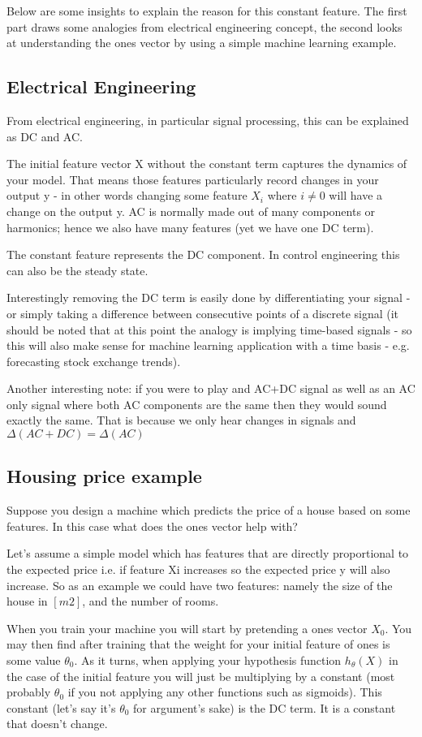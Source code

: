 Below are some insights to explain the reason for this constant feature. The first part draws some analogies from electrical engineering concept, the second looks at understanding the ones vector by using a simple machine learning example.

\subsection{Electrical Engineering}
From electrical engineering, in particular signal processing, this can be explained as DC and AC.

The initial feature vector X without the constant term captures the dynamics of your model. That means those features particularly record changes in your output y - in other words changing some feature $X_i$ where $i\neq0$ will have a change on the output y. AC is normally made out of many components or harmonics; hence we also have many features (yet we have one DC term).

The constant feature represents the DC component. In control engineering this can also be the steady state.

Interestingly removing the DC term is easily done by differentiating your signal - or simply taking a difference between consecutive points of a discrete signal (it should be noted that at this point the analogy is implying time-based signals - so this will also make sense for machine learning application with a time basis - e.g. forecasting stock exchange trends).

Another interesting note: if you were to play and AC+DC signal as well as an AC only signal where both AC components are the same then they would sound exactly the same. That is because we only hear changes in signals and $\Delta(AC+DC) = \Delta(AC)$

\subsection{Housing price example}
Suppose you design a machine which predicts the price of a house based on some features. In this case what does the ones vector help with?

Let's assume a simple model which has features that are directly proportional to the expected price i.e. if feature Xi increases so the expected price y will also increase. So as an example we could have two features: namely the size of the house in $[m2]$, and the number of rooms.

When you train your machine you will start by pretending a ones vector $X_0$. You may then find after training that the weight for your initial feature of ones is some value $\theta_0$. As it turns, when applying your hypothesis function $h_{\theta}(X)$ in the case of the initial feature you will just be multiplying by a constant (most probably $\theta_0$ if you not applying any other functions such as sigmoids). This constant (let's say it's $\theta_0$ for argument's sake) is the DC term. It is a constant that doesn't change.

